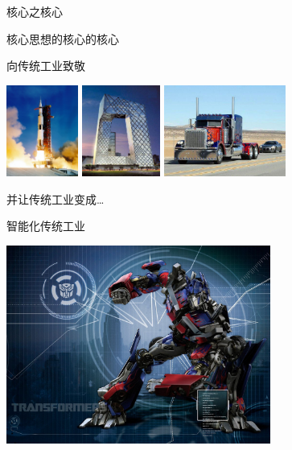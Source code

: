 \begin{frame}{核心之核心}
  \begin{block}{核心思想的核心的核心}
    \begin{center}
      \Huge 向传统工业致敬
    \end{center}
  \end{block}
  \begin{center}
    \includegraphics[height=3cm]{spacecraft.jpg}
    \includegraphics[height=3cm]{cctv.jpg}
    \includegraphics[height=3cm]{prime_trunk.jpg}

    并让传统工业变成\dots
  \end{center}
\end{frame}

\begin{frame}{智能化传统工业}
  \begin{center}
    \includegraphics[height=6.5cm]{prime_robot.jpg}
  \end{center}
\end{frame}

